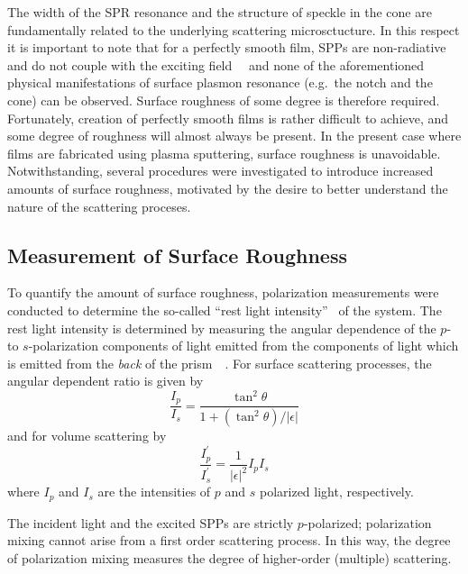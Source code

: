 The width of the SPR resonance and the structure of speckle in the cone are
fundamentally related to the underlying scattering microsctucture.  In this
respect it is important to note that for a perfectly smooth film, SPPs are
non-radiative and do not couple with the exciting
field~\cite{johansson1990theory}~\cite{otto1968excitation} and none of the
aforementioned physical manifestations of surface plasmon resonance (e.g.\ the
notch and the cone) can be observed.  Surface roughness of some degree is
therefore required.  Fortunately, creation of perfectly smooth films is rather
difficult to achieve, and some degree of roughness will almost always be
present.  In the present case where films are fabricated using plasma
sputtering, surface roughness is unavoidable.  Notwithstanding, several
procedures were investigated to introduce increased amounts of surface
roughness, motivated by the desire to better understand the nature of the
scattering proceses.

\subsection{Measurement of Surface Roughness}
To quantify the amount of surface roughness, polarization measurements were
conducted to determine the so-called ``rest light
intensity''~\cite{horstmann1977multiple} of the system.  The rest light
intensity is determined by measuring the angular dependence of the $p$- to
$s$-polarization components of light emitted from the components of light
which is emitted from the \textit{back} of the
prism~\cite{kretschmann1972decay}~\cite{hornauer1976light}.  For surface scattering processes, the
angular dependent ratio is given by~\cite{kretschmann1972thesis}
\begin{equation}
\frac{I_p}{I_s} = \frac{\tan^2\theta}{1+(\tan^2\theta)/|\epsilon|}
\label{eqn:ipssurface}
\end{equation}
and for volume scattering by
\begin{equation}
\frac{I^\prime_p}{I^\prime_s} = \frac{1}{|\epsilon|^2} I_p I_s
\label{eqn:ipsvolume}
\end{equation}
where $I_p$ and $I_s$ are the intensities of $p$ and $s$ polarized light,
respectively.

The incident light and the excited SPPs are strictly $p$-polarized;
polarization mixing cannot arise from a first order scattering process.
In this way, the degree of polarization mixing measures the degree of
higher-order (multiple) scattering.

